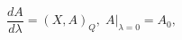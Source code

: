 \begin{equation}
\frac{dA}{d\lambda}=(X,A)_{Q},\;\left.  A\right|  _{\lambda=0}=A_{0}%
,\label{1.12}%
\end{equation}

